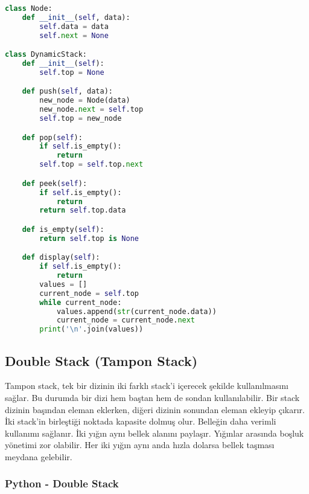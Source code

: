 \begin{lstlisting}[language=Python]
class Node:
    def __init__(self, data):
        self.data = data
        self.next = None

class DynamicStack:
    def __init__(self):
        self.top = None

    def push(self, data):
        new_node = Node(data)
        new_node.next = self.top
        self.top = new_node

    def pop(self):
        if self.is_empty():
            return
        self.top = self.top.next

    def peek(self):
        if self.is_empty():
            return
        return self.top.data

    def is_empty(self):
        return self.top is None

    def display(self):
        if self.is_empty():
            return
        values = []
        current_node = self.top
        while current_node:
            values.append(str(current_node.data))
            current_node = current_node.next
        print('\n'.join(values))
\end{lstlisting}

\newpage

\subsection{Double Stack (Tampon Stack)}

Tampon stack, tek bir dizinin iki farklı stack’i içerecek şekilde kullanılmasını sağlar. Bu durumda bir dizi hem baştan hem de sondan kullanılabilir. Bir stack dizinin başından eleman eklerken, diğeri dizinin sonundan eleman ekleyip çıkarır. İki stack’in birleştiği noktada kapasite dolmuş olur. Belleğin daha verimli kullanımı sağlanır. İki yığın aynı bellek alanını paylaşır. Yığınlar arasında boşluk yönetimi zor olabilir. Her iki yığın aynı anda hızla dolarsa bellek taşması meydana gelebilir.

\subsubsection{Python - Double Stack}

